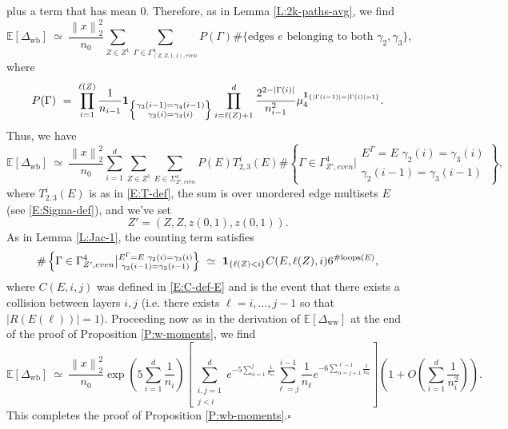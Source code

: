 \documentclass[11pt, reqno]{amsart}
\newcommand{\E}[1]{{\mathbb E}\left [#1\right]}
\newcommand{\abs}[1]{\ensuremath{\left| #1 \right|}}
\newcommand{\lr}[1]{\ensuremath{\left(#1 \right)}}
\newcommand{\norm}[1]{\left\lVert#1\right\rVert}
\newcommand{\set}[1]{\ensuremath{\{#1\}}}
\newcommand{\Dww}{\Delta_{\mathrm{ww}}}
\newcommand{\Dwb}{\Delta_{\mathrm{wb}}}
\begin{document}
plus a term that has mean $0.$ Therefore, as in Lemma \ref{L:2k-paths-avg}, we find
\[\E{\Dwb}~\simeq ~\frac{\norm{x}_2^2}{n_0}\sum_{Z\in Z^1}\sum_{\Gamma\in \Gamma_{(Z,Z,1,1), even}^4} P(\Gamma) \#\set{\text{edges } e \text{ belonging to both } \gamma_2,\gamma_3},\]
where
\[P(\Gamma)~=~\prod_{i=1}^{\ell(Z)}\frac{1}{n_{i-1}}{\bf 1}_{\left\{\substack{\gamma_3(i-1)=\gamma_4(i-1)\\\gamma_3(i)=\gamma_4(i)}\right\}}\prod_{i=\ell(Z)+1}^d \frac{2^{2-\abs{\Gamma(i)}}}{n_{i-1}^2} \mu_4^{{\bf 1}_{\set{\abs{\Gamma(i-1)}=\abs{\Gamma(i)}=1}}}.\]
Thus, we have
\[\E{\Dwb}~\simeq ~\frac{\norm{x}_2^2}{n_0}\sum_{i=1}^d\sum_{Z\in Z^1}\sum_{E\in \Sigma_{Z', even}^4} P(E) T_{2,3}^i(E)\#\left\{\Gamma\in \Gamma_{Z', even}^4 \big| \substack{E^\Gamma = E\,\, \gamma_2(i)=\gamma_3(i)\\\gamma_2(i-1)=\gamma_3(i-1)}\right\} ,\]
where $T_{2,3}^i(E)$ is as in \eqref{E:T-def}, the sum is over unordered edge multisets $E$ (see \eqref{E:Sigma-def}), and we've set
\[Z'=(Z,Z,z(0,1),z(0,1)).\]
As in Lemma \ref{L:Jac-1}, the counting term satisfies
\[\#\left\{\Gamma\in \Gamma_{Z', even}^4 \big| \substack{E^\Gamma = E\,\, \gamma_2(i)=\gamma_3(i)\\\gamma_2(i-1)=\gamma_3(i-1)}\right\}~\simeq~ {\bf 1}_{\set{\ell(Z)<i}}C(E,\ell(Z),i)6^{\#\text{loops}(E)},\]
where $C(E, i,j)$ was defined in \eqref{E:C-def-E} and is the event that there exists a collision between layers $i,j$ (i.e. there exists $\ell=i,\ldots, j-1$ so that $\abs{R(E(\ell))}=1$). Proceeding now as in the derivation of $\E{\Dww}$ at the end of the proof of Proposition \ref{P:w-moments}, we find
\[\E{\Dwb}~\simeq~  \frac{\norm{x}_2^2}{n_0}\exp\lr{5\sum_{i=1}^d \frac{1}{n_i}}\left[\sum_{\substack{i,j=1\\j<i}}^d e^{-5\sum_{\alpha=1}^j \frac{1}{n_\alpha}}\sum_{\ell=j}^{i-1} \frac{1}{n_\ell} e^{-6\sum_{\alpha=j+1}^{\ell-1}\frac{1}{n_\alpha}}\right]\lr{1+O\lr{\sum_{i=1}^d \frac{1}{n_i^2}}}.\]
This completes the proof of Proposition \ref{P:wb-moments}.\hfill $\square$



\end{document}
